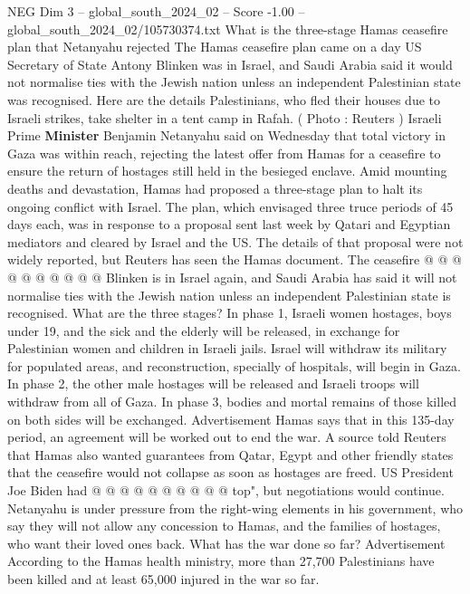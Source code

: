 \begin{textsample}{NEG Dim 3 – global\_south\_2024\_02 – Score -1.00 – global\_south\_2024\_02/105730374.txt}  \label{ex:f3_neg_087}
What is the three-stage Hamas ceasefire plan that Netanyahu rejected The Hamas ceasefire plan came on a day US Secretary of State Antony Blinken was in Israel, and Saudi Arabia said it would not normalise ties with the Jewish nation unless an independent Palestinian state was recognised.
Here are the details Palestinians, who fled their houses due to Israeli strikes, take shelter in a tent camp in Rafah. ( Photo : Reuters ) Israeli Prime \textbf{Minister} Benjamin Netanyahu said on Wednesday that total victory in Gaza was within reach, rejecting the latest offer from Hamas for a ceasefire to ensure the return of hostages still held in the besieged enclave.
Amid mounting deaths and devastation, Hamas had proposed a three-stage plan to halt its ongoing conflict with Israel.
The plan, which envisaged three truce periods of 45 days each, was in response to a proposal sent last week by Qatari and Egyptian mediators and cleared by Israel and the US.
The details of that proposal were not widely reported, but Reuters has seen the Hamas document.
The ceasefire @ @ @ @ @ @ @ @ @ @ Blinken is in Israel again, and Saudi Arabia has said it will not normalise ties with the Jewish nation unless an independent Palestinian state is recognised.
What are the three stages?
In phase 1, Israeli women hostages, boys under 19, and the sick and the elderly will be released, in exchange for Palestinian women and children in Israeli jails.
Israel will withdraw its military for populated areas, and reconstruction, specially of hospitals, will begin in Gaza.
In phase 2, the other male hostages will be released and Israeli troops will withdraw from all of Gaza.
In phase 3, bodies and mortal remains of those killed on both sides will be exchanged.
Advertisement Hamas says that in this 135-day period, an agreement will be worked out to end the war.
A source told Reuters that Hamas also wanted guarantees from Qatar, Egypt and other friendly states that the ceasefire would not collapse as soon as hostages are freed.
US President Joe Biden had @ @ @ @ @ @ @ @ @ @ top", but negotiations would continue.
Netanyahu is under pressure from the right-wing elements in his government, who say they will not allow any concession to Hamas, and the families of hostages, who want their loved ones back.
What has the war done so far?
Advertisement According to the Hamas health ministry, more than 27,700 Palestinians have been killed and at least 65,000 injured in the war so far.

\end{textsample}
